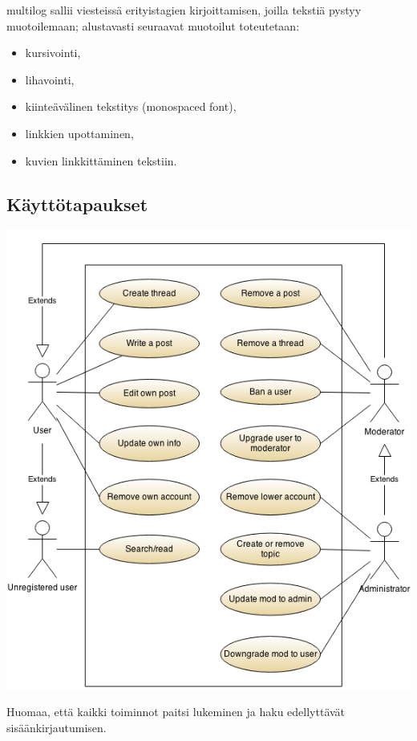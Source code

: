 \documentclass[10pt]{article}
\begin{document}
multilog sallii viesteissä erityistagien kirjoittamisen, joilla tekstiä pystyy muotoilemaan; alustavasti seuraavat muotoilut toteutetaan:
\begin{itemize}
  \item kursivointi,
  \item lihavointi,
  \item kiinteävälinen tekstitys (monospaced font),
  \item linkkien upottaminen,
  \item kuvien linkkittäminen tekstiin.
\end{itemize}

\subsection{Käyttötapaukset}
\includegraphics[width=\textwidth, height=0.9\textheight, keepaspectratio]{multilogUseCaseDiagram}

\noindent Huomaa, että kaikki toiminnot paitsi lukeminen ja haku edellyttävät sisäänkirjautumisen.
\end{document}
